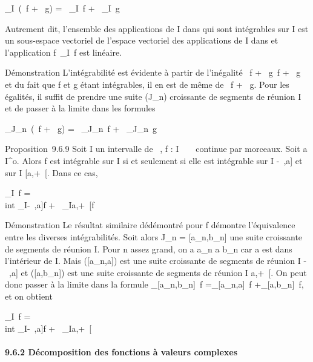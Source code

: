 \documentclass[]{article}
\begin{document}
\int  \_I~(\alpha~f + \beta~g) =
\alpha~\int  \_I~f +
\beta~\int  \_I~g

Autrement dit, l'ensemble des applications de I dans  qui sont
intégrables sur I est un sous-espace vectoriel de l'espace vectoriel des
applications de I dans  et l'application
f\mapsto~\int  \_I~f
est linéaire.

Démonstration L'intégrabilité est évidente à partir de l'inégalité
\textbar{}\alpha~f + \beta~g\textbar{}\leq\textbar{}\alpha~\textbar{}\textbar{}f\textbar{} +
\textbar{}\beta~\textbar{}\textbar{}g\textbar{} et du fait que
\textbar{}f\textbar{} et \textbar{}g\textbar{} étant intégrables, il en
est de même de \textbar{}\alpha~\textbar{}\textbar{}f\textbar{} +
\textbar{}\beta~\textbar{}\textbar{}g\textbar{}. Pour les égalités, il suffit
de prendre une suite (J\_n) croissante de segments de réunion I
et de passer à la limite dans les formules

\int  \_J\_n~(\alpha~f + \beta~g) =
\alpha~\int  \_J\_n~f +
\beta~\int  \_J\_n~g

Proposition~9.6.9 Soit I un intervalle de ~, f : I \rightarrow~ ~ continue par
morceaux. Soit a \in I^o. Alors f est intégrable sur I si et
seulement si elle est intégrable sur I\bigcap{]} -\infty~,a{]} et sur I \bigcap
{[}a,+\infty~{[}. Dans ce cas,

\int  \_I~f =\\int
 \_I\bigcap{]}-\infty~,a{]}f +\int ~
\_I\bigcap{[}a,+\infty~{[}f

Démonstration Le résultat similaire dé démontré pour
\textbar{}f\textbar{} démontre l'équivalence entre les diverses
intégrabilités. Soit alors J\_n =
{[}a\_n,b\_n{]} une suite croissante de segments de
réunion I. Pour n assez grand, on a a\_n \leq a \leq b\_n car
a est dans l'intérieur de I. Mais ({[}a\_n,a{]}) est une suite
croissante de segments de réunion I\bigcap{]} -\infty~,a{]} et
({[}a,b\_n{]}) est une suite croissante de segments de réunion I
\bigcap {[}a,+\infty~{[}. On peut donc passer à la limite dans la formule
\int  \_{[}a\_n,b\_n{]}~f
=\int  \_{[}a\_n,a{]}~f
+\int  \_{[}a,b\_n{]}~f, et on
obtient

\int  \_I~f =\\int
 \_I\bigcap{]}-\infty~,a{]}f +\int ~
\_I\bigcap{[}a,+\infty~{[}

\paragraph{9.6.2 Décomposition des fonctions à valeurs complexes}
\end{document}
